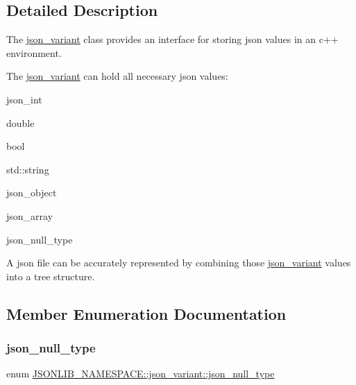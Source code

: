 \subsection{Detailed Description}
The \hyperlink{classJSONLIB__NAMESPACE_1_1json__variant}{json\+\_\+variant} class provides an interface for storing json values in an c++ environment. 

The \hyperlink{classJSONLIB__NAMESPACE_1_1json__variant}{json\+\_\+variant} can hold all necessary json values\+:
\begin{DoxyItemize}
\item json\+\_\+int
\item double
\item bool
\item std\+::string
\item json\+\_\+object
\item json\+\_\+array
\item json\+\_\+null\+\_\+type
\end{DoxyItemize}

A json file can be accurately represented by combining those \hyperlink{classJSONLIB__NAMESPACE_1_1json__variant}{json\+\_\+variant} values into a tree structure. 

\subsection{Member Enumeration Documentation}
\mbox{\label{classJSONLIB__NAMESPACE_1_1json__variant_a1251d2c28258eeebea991ed0b39c3e0c}} 
\subsubsection{\texorpdfstring{json\+\_\+null\+\_\+type}{json\_null\_type}}
{\footnotesize\ttfamily enum \hyperlink{classJSONLIB__NAMESPACE_1_1json__variant_a1251d2c28258eeebea991ed0b39c3e0c}{J\+S\+O\+N\+L\+I\+B\+\_\+\+N\+A\+M\+E\+S\+P\+A\+C\+E\+::json\+\_\+variant\+::json\+\_\+null\+\_\+type}}



